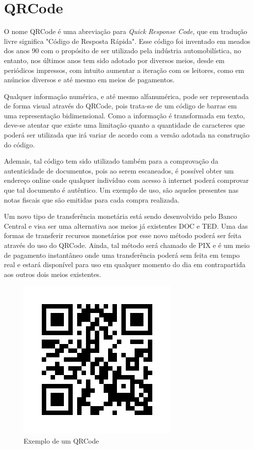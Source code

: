 \section{QRCode}

O nome QRCode\cite{qrCodeOlharDigital} é uma abreviação para \textit{Quick Response Code}, que em tradução livre significa "Código de Resposta Rápida". Esse código foi inventado em meados dos anos 90 com o propósito de ser utilizado pela indústria automobilística, no entanto, nos últimos anos tem sido adotado por diversos meios, desde em periódicos impressos, com intuito aumentar a iteração com os leitores, como em anúncios diversos e até mesmo em meios de pagamentos.\cite{qrCodeCanalTech}

Qualquer informação numérica, e até mesmo alfanumérica, pode ser representada de forma visual através do QRCode, pois trata-se de um código de barras em uma representação bidimensional. Como a informação é transformada em texto, deve-se atentar que existe uma limitação quanto a quantidade de caracteres que poderá ser utilizada que irá variar de acordo com a versão adotada na construção do código.

Ademais, tal código tem sido utilizado também para a comprovação da autenticidade de documentos, pois ao serem escaneados, é possível obter um endereço online onde qualquer indivíduo com acesso à internet poderá comprovar que tal documento é autêntico. Um exemplo de uso, são aqueles presentes nas notas fiscais que são emitidas para cada compra realizada.\cite{nfceDefinicao}

Um novo tipo de transferência monetária está sendo desenvolvido pelo Banco Central e visa ser uma alternativa aos meios já existentes DOC e TED. Uma das formas de transferir recursos monetários por esse novo método poderá ser feita através do uso do QRCode. Ainda, tal método será chamado de PIX e é um meio de pagamento instantâneo onde uma transferência poderá sem feita em tempo real e estará disponível para uso em qualquer momento do dia em contrapartida aos outros dois meios existentes.\cite{pixDefinicao}

\begin{figure}[h]
    \centering
    \includegraphics[scale=0.5]{tcc/figures/exemplo-qrcode.png}
    \caption{Exemplo de um QRCode}
    \label{fig-exemplo-qrcode}
\end{figure}

